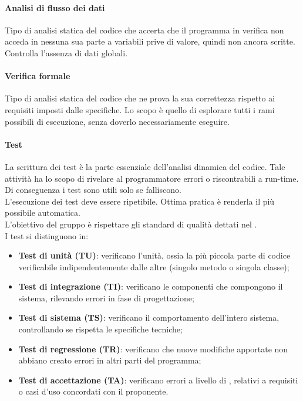 \paragraph{Analisi di flusso dei dati} 
Tipo di analisi statica del codice che accerta che il programma in verifica non acceda in nessuna sua parte a variabili prive di valore, quindi non ancora scritte. Controlla l'assenza di dati globali.

\paragraph{Verifica formale} 
Tipo di analisi statica del codice che ne prova la sua correttezza rispetto ai requisiti imposti dalle specifiche. Lo scopo è quello di esplorare tutti i rami possibili di esecuzione, senza doverlo necessariamente eseguire. 

\paragraph{Test} 
La scrittura dei test è la parte essenziale dell'analisi dinamica del codice. Tale attività ha lo scopo di rivelare al programmatore errori o  riscontrabili a run-time. Di conseguenza i test sono utili solo se falliscono. \\
L'esecuzione dei test deve essere ripetibile. Ottima pratica è renderla il più possibile automatica. \\
L'obiettivo del gruppo è rispettare gli standard di qualità dettati nel \PdQv. \\
I test si distinguono in:
\begin{itemize}
	\item \textbf{Test di unità (TU)}: verificano l'unità, ossia la più piccola parte di codice verificabile indipendentemente dalle altre (singolo metodo o singola classe);
	\item \textbf{Test di integrazione (TI)}: verificano le componenti che compongono il sistema, rilevando errori in fase di progettazione;
	\item \textbf{Test di sistema (TS)}: verificano il comportamento dell'intero sistema, controllando se rispetta le specifiche tecniche;
	\item \textbf{Test di regressione (TR)}: verificano che nuove modifiche apportate non abbiano creato errori in altri parti del programma;
	\item \textbf{Test di accettazione (TA)}: verificano errori a livello di , relativi a requisiti o casi d'uso concordati con il proponente.
\end{itemize}


